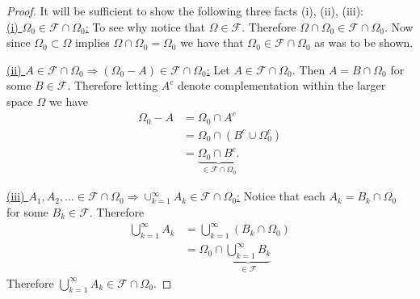 \documentclass[10pt,letterpaper,twocolumn]{article}
\begin{document}
\begin{proof} It will be sufficient to show the following three facts (i), (ii), (iii):\\
\underline{(i) $\Omega_0\in \mathcal F\cap \Omega_0$:} 
To see why notice that $\Omega \in \mathcal F$. Therefore $\Omega\cap \Omega_0\in \mathcal F\cap \Omega_0$. Now since $\Omega_0\subset \Omega$ implies $\Omega\cap\Omega_0= \Omega_0$ we have that $\Omega_0\in \mathcal F\cap \Omega_0$ as was to be shown.

\noindent
\underline{(ii) $A\in \mathcal F\cap \Omega_0\Rightarrow (\Omega_0 - A)\in \mathcal F\cap \Omega_0$:} Let $A\in \mathcal F\cap \Omega_0$. Then $A = B\cap \Omega_0$ for some $B\in\mathcal F$. Therefore letting $A^c$ denote complementation within the larger space $\Omega$ we have
\begin{align*}
\Omega_0-A & = \Omega_0 \cap A^c\\
& =\Omega_0 \cap (B^c \cup \Omega_0^c)\\
& =\underbrace{\Omega_0 \cap B^c.}_{\in\mathcal F\cap \Omega_0}
\end{align*}

\noindent
\underline{(iii) $A_1,A_2,\ldots \in \mathcal F\cap \Omega_0\Rightarrow \cup_{k=1}^\infty A_k\in \mathcal F\cap \Omega_0$:} Notice that each $A_k = B_k\cap \Omega_0$ for some $B_k\in\mathcal F$. Therefore
\begin{align*}
\bigcup_{k=1}^\infty A_k &=\bigcup_{k=1}^\infty (B_k\cap \Omega_0)\\
&=\Omega_0\cap \underbrace{\bigcup_{k=1}^\infty B_k}_{\in \mathcal F}
\end{align*}
Therefore $\bigcup_{k=1}^\infty A_k \in \mathcal F\cap \Omega_0$.
\end{proof}
\end{document}
